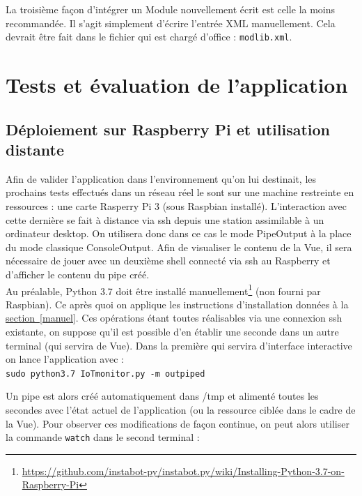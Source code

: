 \documentclass[]{article}
\newcommand{\wordlink}[2]{\hyperref[#1]{#2~\ref{#1}}}
\begin{document}
\par La troisième façon d'intégrer un Module nouvellement écrit est celle la moins recommandée. Il s'agit simplement d'écrire l'entrée XML manuellement. Cela devrait être fait dans le fichier qui est chargé d'office : \texttt{modlib.xml}.

\newpage


\section{Tests et évaluation de l'application}

\subsection{Déploiement sur Raspberry Pi et utilisation distante}

Afin de valider l'application dans l'environnement qu'on lui destinait, les prochains tests effectués  dans un réseau réel le sont sur une machine restreinte en ressources : une carte Rasperry Pi 3 (sous Raspbian installé). L'interaction avec cette dernière se fait à distance via ssh depuis une station assimilable à un ordinateur desktop. On utilisera donc dans ce cas le mode PipeOutput à la place du mode classique ConsoleOutput. Afin de visualiser le contenu de la Vue, il sera nécessaire de jouer avec un deuxième shell connecté via ssh au Raspberry et d'afficher le contenu du pipe créé.\\

Au préalable, Python 3.7 doit être installé manuellement\footnote{\url{https://github.com/instabot-py/instabot.py/wiki/Installing-Python-3.7-on-Raspberry-Pi}} (non fourni par Raspbian). Ce après quoi on applique les instructions d'installation données à la \wordlink{manuel}{section}. Ces opérations étant toutes réalisables via une connexion ssh existante, on suppose qu'il est possible d'en établir une seconde dans un autre terminal (qui servira de Vue). Dans la première qui servira d'interface interactive on lance l'application avec :~\\

\indent \texttt{sudo python3.7 IoTmonitor.py -m outpiped}
\vspace{0.4cm}
\par Un pipe est alors créé automatiquement dans /tmp et alimenté toutes les secondes avec l'état actuel de l'application (ou la ressource ciblée dans le cadre de la Vue). Pour observer ces modifications de façon continue, on peut alors utiliser la commande \texttt{watch} dans le second terminal :~\\
\end{document}

